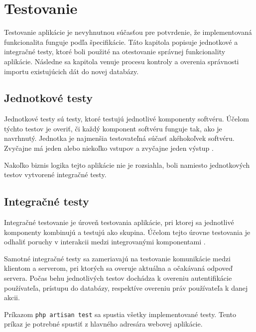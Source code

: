\chapter{Testovanie}
Testovanie aplikácie je nevyhnutnou súčasťou pre potvrdenie, že implementovaná funkcionalita funguje podľa špecifikácie. Táto kapitola popisuje jednotkové a integračné testy, ktoré boli použité na otestovanie správnej funkcionality aplikácie. Následne sa kapitola venuje procesu kontroly a overenia správnosti importu existujúcich dát do novej databázy.

\section{Jednotkové testy}
Jednotkové testy sú testy, ktoré testujú jednotlivé komponenty softvéru. Účelom týchto testov je overiť, či každý komponent softvéru funguje tak, ako je navrhnutý. Jednotka je najmenšia testovateľná súčasť akéhokoľvek softvéru. Zvyčajne má jeden alebo niekoľko vstupov a zvyčajne jeden výstup \cite{co-je-unit-testing}.

Nakoľko biznis logika tejto aplikácie nie je rozsiahla, boli namiesto jednotkových testov vytvorené integračné testy.

\section{Integračné testy}
Integračné testovanie je úroveň testovania aplikácie, pri ktorej sa jednotlivé komponenty kombinujú a testujú ako skupina. Účelom tejto úrovne testovania je odhaliť poruchy v interakcii medzi integrovanými komponentami \cite{co-su-integracne-testy}.

Samotné integračné testy sa zameriavajú na testovanie komunikácie medzi klientom a serverom, pri ktorých sa overuje aktuálna a očakávaná odpoveď servera. Počas behu jednotlivých testov dochádza k overeniu autentifikácie používateľa, prístupu do databázy, respektíve overeniu práv používateľa k danej akcii.

\pagebreak

Príkazom \texttt{php artisan test} sa spustia všetky implementované testy. Tento príkaz je potrebné spustiť z hlavného adresára webovej aplikácie.

